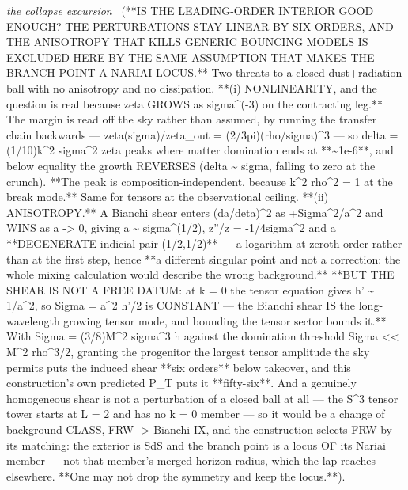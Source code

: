 \begin{description}
\textit{the collapse excursion} \ (**IS THE LEADING-ORDER INTERIOR GOOD ENOUGH? THE PERTURBATIONS STAY LINEAR BY SIX ORDERS, AND THE ANISOTROPY THAT KILLS GENERIC BOUNCING MODELS IS EXCLUDED HERE BY THE SAME ASSUMPTION THAT MAKES THE BRANCH POINT A NARIAI LOCUS.** Two threats to a closed dust+radiation ball with no anisotropy and no dissipation. **(i) NONLINEARITY, and the question is real because zeta GROWS as \textbar{}sigma\textbar{}\textasciicircum{}(-3) on the contracting leg.** The margin is read off the sky rather than assumed, by running the transfer chain backwards --- zeta(sigma)/zeta\_out = (2/3pi)(rho/\textbar{}sigma\textbar{})\textasciicircum{}3 --- so delta = (1/10)k\textasciicircum{}2 sigma\textasciicircum{}2 zeta peaks where matter domination ends at **\textasciitilde{}1e-6**, and below equality the growth REVERSES (delta \textasciitilde{} \textbar{}sigma\textbar{}, falling to zero at the crunch). **The peak is composition-independent, because k\textasciicircum{}2 rho\textasciicircum{}2 = 1 at the break mode.** Same for tensors at the observational ceiling. **(ii) ANISOTROPY.** A Bianchi shear enters (da/deta)\textasciicircum{}2 as +Sigma\textasciicircum{}2/a\textasciicircum{}2 and WINS as a -> 0, giving a \textasciitilde{} \textbar{}sigma\textbar{}\textasciicircum{}(1/2), z''/z = -1/4sigma\textasciicircum{}2 and a **DEGENERATE indicial pair (1/2,1/2)** --- a logarithm at zeroth order rather than at the first step, hence **a different singular point and not a correction: the whole mixing calculation would describe the wrong background.** **BUT THE SHEAR IS NOT A FREE DATUM: at k = 0 the tensor equation gives h' \textasciitilde{} 1/a\textasciicircum{}2, so Sigma = a\textasciicircum{}2 h'/2 is CONSTANT --- the Bianchi shear IS the long-wavelength growing tensor mode, and bounding the tensor sector bounds it.** With Sigma = (3/8)M\textasciicircum{}2 \textbar{}sigma\textbar{}\textasciicircum{}3 h against the domination threshold Sigma << M\textasciicircum{}2 rho\textasciicircum{}3/2, granting the progenitor the largest tensor amplitude the sky permits puts the induced shear **six orders** below takeover, and this construction's own predicted P\_T puts it **fifty-six**. And a genuinely homogeneous shear is not a perturbation of a closed ball at all --- the S\textasciicircum{}3 tensor tower starts at L = 2 and has no k = 0 member --- so it would be a change of background CLASS, FRW -> Bianchi IX, and the construction selects FRW by its matching: the exterior is SdS and the branch point is a locus OF its Nariai member --- not that member's merged-horizon radius, which the lap reaches elsewhere. **One may not drop the symmetry and keep the locus.**). 

\end{description}
